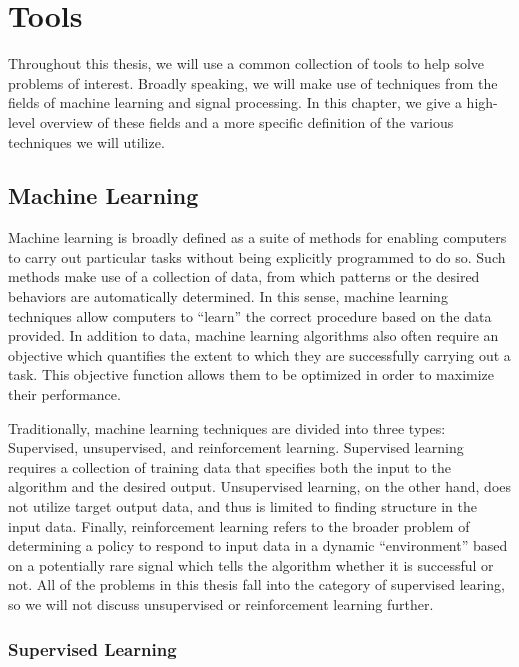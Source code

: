 \chapter{Tools} \label{ch:tools}

Throughout this thesis, we will use a common collection of tools to help solve problems of interest.
Broadly speaking, we will make use of techniques from the fields of machine learning and signal processing.
In this chapter, we give a high-level overview of these fields and a more specific definition of the various techniques we will utilize.

\section{Machine Learning}

Machine learning is broadly defined as a suite of methods for enabling computers to carry out particular tasks without being explicitly programmed to do so.
Such methods make use of a collection of data, from which patterns or the desired behaviors are automatically determined.
In this sense, machine learning techniques allow computers to ``learn'' the correct procedure based on the data provided.
In addition to data, machine learning algorithms also often require an objective which quantifies the extent to which they are successfully carrying out a task.
This objective function allows them to be optimized in order to maximize their performance.

Traditionally, machine learning techniques are divided into three types: Supervised, unsupervised, and reinforcement learning.
Supervised learning requires a collection of training data that specifies both the input to the algorithm and the desired output.
Unsupervised learning, on the other hand, does not utilize target output data, and thus is limited to finding structure in the input data.
Finally, reinforcement learning refers to the broader problem of determining a policy to respond to input data in a dynamic ``environment'' based on a potentially rare signal which tells the algorithm whether it is successful or not.
All of the problems in this thesis fall into the category of supervised learing, so we will not discuss unsupervised or reinforcement learning further.

\subsection{Supervised Learning}

